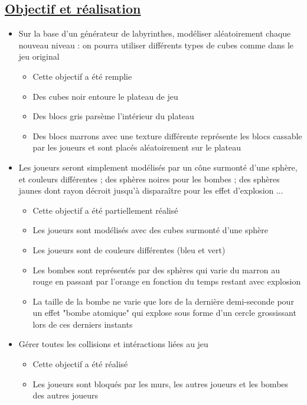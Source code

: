 \documentclass{article}
\begin{document}
    \subsection[Objectif et réalisation]{\href{https://expreg.org/amsi/C/APG2122S1/supports/projets.pdf}{Objectif et réalisation}}
    \begin{itemize}
        \item Sur la base d’un générateur de labyrinthes, modéliser aléatoirement chaque nouveau niveau : on pourra utiliser différents types de cubes
        comme dans le jeu original
        \begin{itemize}
            \item Cette objectif a été remplie
            \item Des cubes noir entoure le plateau de jeu
            \item Des blocs gris parsème l'intérieur du plateau
            \item Des blocs marrons avec une texture différente représente les blocs cassable par les joueurs et sont placés aléatoirement sur le plateau
        \end{itemize}

        \item Les joueurs seront simplement modélisés par un cône surmonté d’une sphère, et couleurs différentes ; des sphères noires pour les bombes ; des sphères jaunes dont rayon décroit jusqu’à disparaître pour les effet d’explosion ...
        \begin{itemize}
            \item Cette objectif a été partiellement réalisé
            \item Les joueurs sont modélisés avec des cubes surmonté d'une sphère
            \item Les joueurs sont de couleurs différentes (bleu et vert)
            \item Les bombes sont représentés par des sphères qui varie du marron au rouge en passant par l'orange en fonction du temps restant avec explosion
            \item La taille de la bombe ne varie que lors de la dernière demi-seconde pour un effet "bombe atomique" qui explose sous forme d'un cercle grossissant lors de ces derniers instants
        \end{itemize}

        \item Gérer toutes les collisions et intéractions liées au jeu
        \begin{itemize}
            \item Cette objectif a été réalisé
            \item Les joueurs sont bloqués par les murs, les autres joueurs et les bombes des autres joueurs
        \end{itemize}


\end{itemize}
\end{document}
